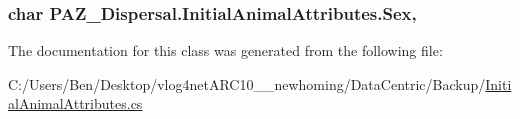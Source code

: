 \hypertarget{class_p_a_z___dispersal_1_1_initial_animal_attributes_accb60dfed8b0f4f2978de5486a40e42b}{
\subsubsection[{Sex}]{\setlength{\rightskip}{0pt plus 5cm}char P\-A\-Z\-\_\-\-Dispersal.\-Initial\-Animal\-Attributes.\-Sex\hspace{0.3cm}{\ttfamily [get]}, {\ttfamily [set]}}}\label{class_p_a_z___dispersal_1_1_initial_animal_attributes_accb60dfed8b0f4f2978de5486a40e42b}


The documentation for this class was generated from the following file\-:\begin{DoxyCompactItemize}
\item 
C\-:/\-Users/\-Ben/\-Desktop/vlog4net\-A\-R\-C10\-\_\-\_\-newhoming/\-Data\-Centric/\-Backup/\hyperlink{_backup_2_initial_animal_attributes_8cs}{Initial\-Animal\-Attributes.\-cs}\end{DoxyCompactItemize}
